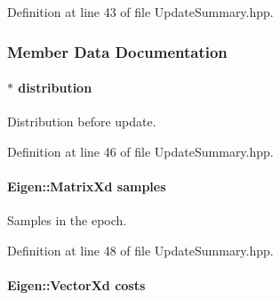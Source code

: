 Definition at line 43 of file Update\+Summary.\+hpp.



\subsubsection{Member Data Documentation}
\hypertarget{classDmpBbo_1_1UpdateSummary_a54b1ed1562d24d76c441110de5a0183f}{
\paragraph[{distribution}]{$\ast$ distribution}}\label{classDmpBbo_1_1UpdateSummary_a54b1ed1562d24d76c441110de5a0183f}


Distribution before update. 



Definition at line 46 of file Update\+Summary.\+hpp.

\hypertarget{classDmpBbo_1_1UpdateSummary_ab0da48c0dfcd090ea3086c283e267415}{
\paragraph[{samples}]{\setlength{\rightskip}{0pt plus 5cm}Eigen\+::\+Matrix\+Xd samples}}\label{classDmpBbo_1_1UpdateSummary_ab0da48c0dfcd090ea3086c283e267415}


Samples in the epoch. 



Definition at line 48 of file Update\+Summary.\+hpp.

\hypertarget{classDmpBbo_1_1UpdateSummary_ac3b47ca8e32f8b5cdaa23bdd375ccfd3}{
\paragraph[{costs}]{\setlength{\rightskip}{0pt plus 5cm}Eigen\+::\+Vector\+Xd costs}}\label{classDmpBbo_1_1UpdateSummary_ac3b47ca8e32f8b5cdaa23bdd375ccfd3}


